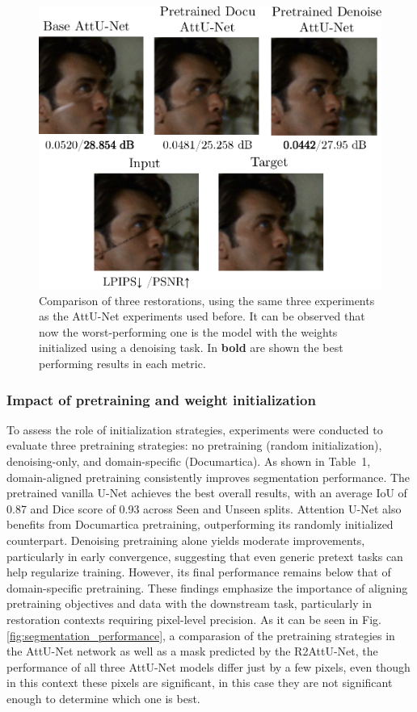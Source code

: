 \documentclass[10pt,a4paper,twocolumn,twoside]{article}
\begin{document}
\begin{figure}[htbp]
    \centering
    \includegraphics[width=0.8\linewidth]{img/repaint.pdf}
    \caption{\small Comparison of three restorations, using the same three experiments as the AttU-Net experiments used before. It can be observed that now the worst-performing one is the model with the weights initialized using a denoising task. In \textbf{bold} are shown the best performing results in each metric. }
    \label{fig:repaint_comparison}
\end{figure}


\subsubsection{Impact of pretraining and weight initialization}
To assess the role of initialization strategies, experiments were conducted to evaluate three pretraining strategies: no pretraining (random initialization), denoising-only, and domain-specific (Documartica). As shown in Table~1, domain-aligned pretraining consistently improves segmentation performance. The pretrained vanilla U-Net achieves the best overall results, with an average IoU of 0.87 and Dice score of 0.93 across Seen and Unseen splits. Attention U-Net also benefits from Documartica pretraining, outperforming its randomly initialized counterpart.
Denoising pretraining alone yields moderate improvements, particularly in early convergence, suggesting that even generic pretext tasks can help regularize training. However, its final performance remains below that of domain-specific pretraining. These findings emphasize the importance of aligning pretraining objectives and data with the downstream task, particularly in restoration contexts requiring pixel-level precision. As it can be seen in Fig. \ref{fig:segmentation_performance}, a comparasion of the pretraining strategies in the AttU-Net network as well as a mask predicted by the R2AttU-Net, the performance of all three AttU-Net models differ just by a few pixels, even though in this context these pixels are significant, in this case they are not significant enough to determine which one is best. 
\end{document}
